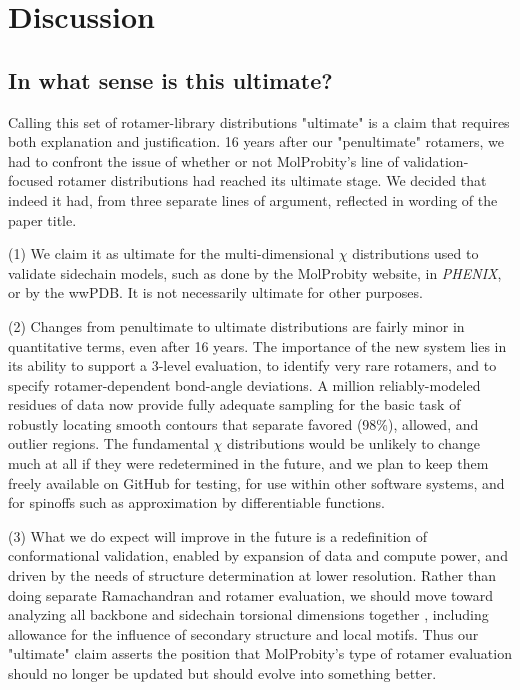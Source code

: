\section{Discussion}

\subsection{In what sense is this ultimate?}
Calling this set of rotamer-library distributions "ultimate" is a claim that requires both explanation and justification. \textcolor{changecolor}{16 years after our "penultimate" rotamers, we had to confront the issue of whether or not MolProbity's line of validation-focused rotamer distributions had reached its ultimate stage. We decided that indeed it had, from three separate lines of argument, reflected in wording of the paper title}.

\textcolor{changecolor}{(1) We claim it as ultimate for the multi-dimensional $\chi$ distributions used to validate sidechain models,} such as done by the MolProbity website, in \textit{PHENIX}, or by the wwPDB. \textcolor{changecolor}{It is not necessarily ultimate for other purposes.}

\textcolor{changecolor}{(2) C}hanges from penultimate to ultimate distributions are fairly minor in quantitative terms, \textcolor{changecolor}{even after 16 years.} The importance of the new system lies in its ability to support a 3-level evaluation, to identify very rare rotamers, and to specify rotamer-dependent bond-angle deviations.  A million \textcolor{changecolor}{reliably-modeled residues of data now} provide fully adequate sampling for the basic task of robustly locating smooth contours that separate favored (98\%), allowed, and outlier regions. The fundamental $\chi$ distributions would be unlikely to change \textcolor{changecolor}{much at all if they were redetermined in the future, and we plan to keep them freely available on GitHub for testing, for use within other software systems, and for spinoffs such as approximation by differentiable functions.}

\textcolor{changecolor}{(3)  W}hat we do expect will improve in the future is a redefinition of conformational validation, enabled by expansion of data and compute power, and \textcolor{changecolor}{driven by} the needs of structure determination at lower resolution. Rather than doing separate Ramachandran and rotamer evaluation, we should move toward analyzing all backbone and sidechain torsional dimensions together \cite{JSR_theplot_2013}, including allowance for the influence of secondary structure and local motifs. Thus our "ultimate" claim asserts the position that \textcolor{changecolor}{MolProbity's type of }rotamer evaluation should no longer be updated but should evolve into something \textcolor{changecolor}{better}.

